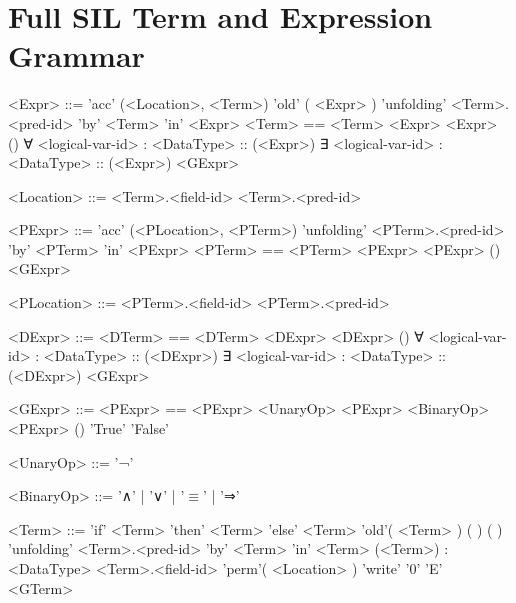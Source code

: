 
\appendix
\section{Full SIL Term and Expression Grammar}\label{apdx:grammar}
\begin{grammar}
<Expr> ::= 'acc' (<Location>, <Term>)
	\alt 'old' ( <Expr> )
	\alt 'unfolding' <Term>.<pred-id> 'by' <Term> 'in' <Expr>
	\alt <Term> == <Term>
	\alt <unary-op> <Expr>
	\alt <binary-op> <Expr>
	\alt <dom-pred-id>()
	\alt ∀ <logical-var-id> : <DataType> :: (<Expr>)
	\alt ∃ <logical-var-id> : <DataType> :: (<Expr>)
	\alt <GExpr>

<Location> ::= <Term>.<field-id>
	\alt <Term>.<pred-id>
\end{grammar}

\begin{grammar}
<PExpr> ::= 'acc' (<PLocation>, <PTerm>)
	\alt 'unfolding' <PTerm>.<pred-id> 'by' <PTerm> 'in' <PExpr>
	\alt <PTerm> == <PTerm>
	\alt <unary-op> <PExpr>
	\alt <binary-op> <PExpr>
	\alt <dom-pred-id>()
	\alt <GExpr>

<PLocation> ::= <PTerm>.<field-id>
	\alt <PTerm>.<pred-id>
\end{grammar}

\begin{grammar}
<DExpr> ::= <DTerm> == <DTerm>
	\alt <unary-op> <DExpr>
	\alt <binary-op> <DExpr>
	\alt <dom-pred-id>()
	\alt ∀ <logical-var-id> : <DataType> :: (<DExpr>)
	\alt ∃ <logical-var-id> : <DataType> :: (<DExpr>)
	\alt <GExpr>
\end{grammar}

\begin{grammar}
<GExpr> ::= <PExpr> == <PExpr>
	\alt <UnaryOp> <PExpr>
	\alt <BinaryOp> <PExpr>
	\alt <dom-pred-id>()
	\alt 'True'
	\alt 'False'
\end{grammar}

\begin{grammar}
<UnaryOp> ::= '¬'

<BinaryOp> ::= '∧' | '∨' | '$\equiv$' | '⇒'
\end{grammar}

\begin{grammar}
<Term> ::= 'if' <Term> 'then' <Term> 'else' <Term>
	\alt 'old'( <Term> )
	\alt <func-id>(  )
	\alt <dom-func-id>(  )
	\alt 'unfolding' <Term>.<pred-id> 'by' <Term> 'in' <Term>
	\alt (<Term>) : <DataType>
	\alt <Term>.<field-id>
	\alt 'perm'( <Location> )
	\alt 'write'
	\alt '0'
	\alt  'E'
	\alt <GTerm>
\end{grammar}

